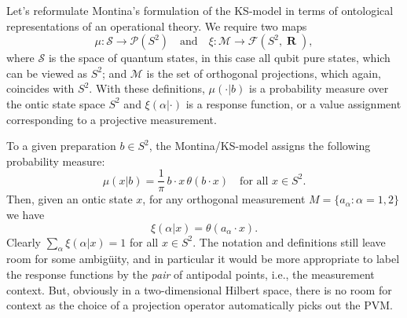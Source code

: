 \documentclass[12pt,draft]{article}
\DeclareMathOperator{\R}{\mathbf{R}}
\theoremstyle{definition}
\theoremstyle{plain}
\begin{document}
    {
        \color{blue} Let's reformulate Montina's formulation
        of the KS-model in terms of ontological
        representations of an operational theory. We require
        two maps
        \begin{equation}
            \mu
            : \mathcal{S} \to \mathcal{P}(S^2)
            \quad\text{and}\quad
            \xi
            : \mathcal{M} \to \mathcal{F}(S^2, \R),
        \end{equation}
        where $\mathcal{S}$ is the space of quantum states,
        in this case all qubit pure states, which can be
        viewed as $S^2$; and $\mathcal{M}$ is the set of
        orthogonal projections, which again, coincides with
        $S^2$. With these definitions, $\mu(\cdot | b)$ is a
        probability measure over the ontic state space $S^2$
        and $\xi(\alpha | \cdot)$ is a response function, or
        a value assignment corresponding to a projective
        measurement.

        To a given preparation $b \in S^2$, the
        Montina/KS-model assigns the following probability
        measure: 
        \begin{equation}
            \mu(x | b)
            = \frac{1}{\pi} \, b \cdot x \, \theta(b \cdot
            x)
            \quad \text{for all } x \in S^2.
        \end{equation}
        Then, given an ontic state $x$, for any orthogonal
        measurement $M = \{a_\alpha : \alpha = 1,2 \}$
        we have
        \begin{equation}
            \xi(\alpha | x) 
            = \theta(a_\alpha \cdot x).
        \end{equation}
        Clearly $\sum_{\alpha}^{} \xi(\alpha | x) = 1$ for
        all $x \in S^2$. The notation and definitions still
        leave room for some ambigüity, and in particular it
        would be more appropriate to label the response
        functions by the \textit{pair} of antipodal points,
        i.e., the measurement context. But, obviously in a
        two-dimensional Hilbert space, there is no room for
        context as the choice of a projection operator
        automatically picks out the PVM.

}
\end{document}

